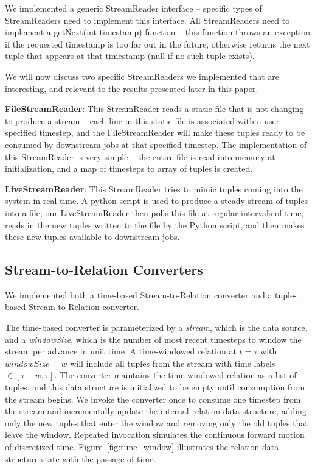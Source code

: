\documentclass[a4paper, 10pt, conference]{IEEEconf}
\begin{document}
We implemented a generic StreamReader interface -- specific types of StreamReaders need to implement this interface. All StreamReaders need to implement a getNext(int timestamp) function -- this function throws an exception if the requested timestamp is too far out in the future, otherwise returns the next tuple that appears at that timestamp (null if no such tuple exists).

We will now discuss two specific StreamReaders we implemented that are interesting, and relevant to the results presented later in this paper.

\textbf{FileStreamReader}: This StreamReader reads a static file that is not changing to produce a stream -- each line in this static file is associated with a user-specified timestep, and the FileStreamReader will make these tuples ready to be consumed by downstream jobs at that specified timestep.
The implementation of this StreamReader is very simple -- the entire file is read into memory at initialization, and a map of timesteps to array of tuples is created.

\textbf{LiveStreamReader}: This StreamReader tries to mimic tuples coming into the system in real time. A python script is used to produce a steady stream of tuples into a file; our LiveStreamReader then polls this file at regular intervals of time, reads in the new tuples written to the file by the Python script, and then makes these new tuples available to downstream jobs.


\subsection{Stream-to-Relation Converters}
We implemented both a time-based Stream-to-Relation converter and a tuple-based Stream-to-Relation converter. 

The time-based converter is parameterized by a \textit{stream}, which is the data source, and a \textit{windowSize}, which is the number of most recent timesteps to window the stream per advance in unit time. A time-windowed relation at $t = \tau$ with $windowSize = w$ will include all tuples from the stream with time labels $\in [\tau - w, \tau]$. The converter maintains the time-windowed relation as a list of tuples, and this data structure is initialized to be empty until consumption from the stream begins. We invoke the converter once to consume one timestep from the stream and incrementally update the internal relation data structure, adding only the new tuples that enter the window and removing only the old tuples that leave the window. Repeated invocation simulates the continuous forward motion of discretized time. Figure~\ref{fig:time_window} illustrates the relation data structure state with the passage of time. 
\end{document}
